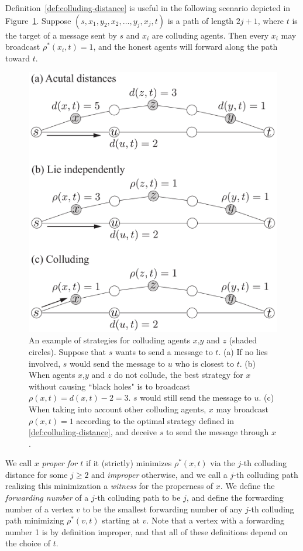 \documentclass[reprint]{revtex4-1}
\begin{document}
Definition~\ref{def:colluding-distance} is useful in the following scenario
depicted in Figure~\ref{fig:colluding-distance}. Suppose $(s, x_1, y_2, x_2,
\dots, y_j, x_j, t)$ is a path of length $2j + 1$, where $t$ is the target of a
message sent by $s$ and $x_i$ are colluding agents.  Then every $x_i$ may
broadcast $\rho^*(x_i, t) = 1$, and 
the honest agents will forward along the path toward $t$.

\begin{figure}[thb]
\centering
\includegraphics[width=\textwidth]{images/strategy.pdf}
\caption{An example of strategies for colluding agents $x$,$y$ and $z$ (shaded circles). Suppose that $s$ wants to send a message to $t$. (a) If no lies involved, $s$ would send the message to $u$ who is closest to $t$. (b) When agents $x$,$y$ and $z$ do not collude, the best strategy for $x$ without causing ``black holes" is to broadcast $\rho(x,t) = d(x,t) - 2=3$. $s$ would still send the message to $u$. (c) When taking into account other colluding agents, $x$ may broadcast $\rho(x,t) = 1$ according to the optimal strategy defined in \ref{def:colluding-distance}, and deceive $s$ to send the message through $x$.  }
\label{fig:colluding-distance}
\end{figure}

We call $x$ \emph{proper for $t$} if it (strictly) minimizes $\rho^*(x,t)$ via
the $j$-th colluding distance for some $j \geq 2$ and \emph{improper}
otherwise, and we call a $j$-th colluding path realizing this minimization a
\emph{witness} for the properness of $x$. We define the \emph{forwarding
number} of a $j$-th colluding path to be $j$, and define the forwarding number
of a vertex $v$ to be the smallest forwarding number of any $j$-th colluding
path minimizing $\rho^*(v,t)$ starting at $v$. Note that a vertex with a
forwarding number 1 is by definition improper, and that all of these
definitions depend on the choice of $t$.
\end{document}
